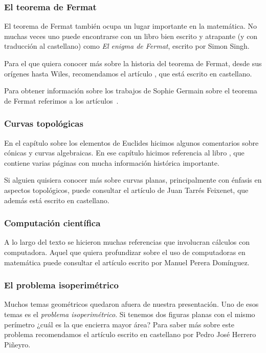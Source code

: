 \subsubsection*{El teorema de Fermat}

El teorema de Fermat también ocupa un lugar importante en 
la matemática. No muchas veces uno puede encontrarse
con un libro bien escrito y atrapante (y con traducción al castellano) 
como \emph{El enigma de Fermat}, escrito por Simon Singh. 

Para
el que quiera conocer más sobre la historia del teorema
de Fermat, desde sus orígenes hasta Wiles, 
recomendamos el artículo \cite{corry_fermat}, que está escrito en castellano.  

Para obtener información sobre
los trabajos de Sophie Germain sobre el teorema de Fermat referimos a los
artículos~\cite{MR2415091,MR2735899}.

\subsubsection*{Curvas topológicas}

En el capítulo sobre los elementos de Euclides hicimos algunos
comentarios sobre cónicas y curvas algebraicas. En ese capítulo 
hicimos referencia al libro \cite{MR2975988}, que contiene
varias páginas con mucha información histórica importante. 

Si alguien 
quisiera conocer más sobre curvas planas, principalmente con énfasis 
en aspectos topológicos, 
puede consultar el artículo \cite{tf_curvas} de Juan Tarrés Feixenet, 
que además está escrito en castellano. 

\subsubsection*{Computación científica}

A lo largo del texto se hicieron muchas referencias que involucran cálculos
con computadora. Aquel que quiera profundizar sobre 
el uso de computadoras en matemática puede consultar
el artículo \cite{pd_ENIAC} escrito por Manuel Perera Domínguez. 

\subsubsection*{El problema isoperimétrico}

Muchos temas geométricos quedaron afuera de nuestra presentación. Uno de esos
temas es el \emph{problema isoperimétrico}. Si tenemos dos figuras planas
con el mismo perímetro ¿cuál es la que encierra mayor área? Para 
saber más sobre este problema 
recomendamos el artículo \cite{hp_isoperimetric} 
escrito en castellano por Pedro Jos{\'e} Herrero Pi{\~n}eyro. 

